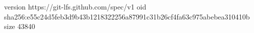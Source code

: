 version https://git-lfs.github.com/spec/v1
oid sha256:e55c24d5feb3d9b43b1218322256a87991c31b26cf4fa63c975abebea310410b
size 43840
